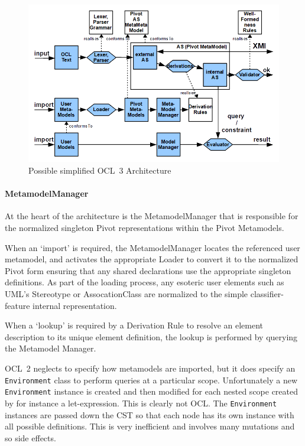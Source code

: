 \documentclass{jot}
\begin{document}
\begin{figure}
	\begin{center}
		\includegraphics[width=4.5in]{OCL3Architecture.png}
	\end{center}
	\caption{Possible simplified OCL~3 Architecture}
	\label{fig:OCL3Architecture}
\end{figure}

\paragraph{MetamodelManager}

At the heart of the architecture is the MetamodelManager that is responsible for the normalized singleton Pivot representations within
the Pivot Metamodels.

When an `import' is required, the MetamodelManager locates the referenced user metamodel, and activates the appropriate Loader to convert it to the normalized Pivot form ensuring that any shared declarations use the appropriate singleton definitions. As part of the loading process, any esoteric user elements such as UML's Stereotype or AssocationClass are normalized to the simple classifier-feature internal representation.

When a `lookup' is required by a Derivation Rule to resolve an element description to its unique element definition, the lookup is performed by querying the Metamodel Manager.

OCL~2 neglects to specify how metamodels are imported, but it does specify an \verb$Environment$ class to perform queries at a particular scope. Unfortunately a new \verb$Environment$ instance is created and then modified for each nested scope created by for instance a let-expression. This is clearly not OCL. The \verb$Environment$ instances are passed down the CST so that each node has its own instance with all possible definitions. This is very inefficient and involves many mutations and so side effects.
\end{document}
